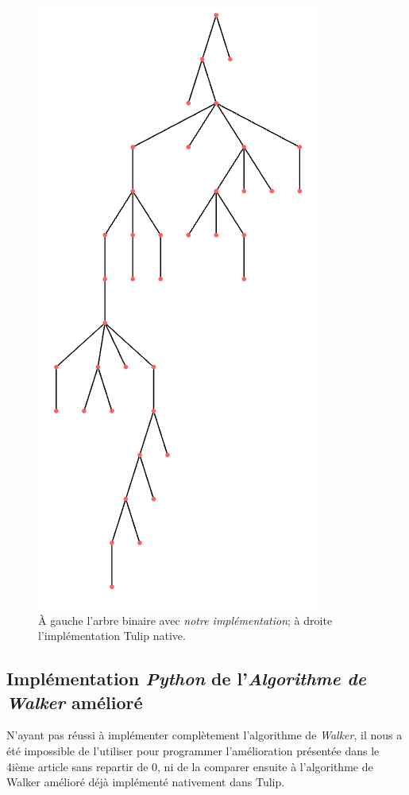 \documentclass{article}
\begin{document}
\begin{figure}[h]
\begin{center}
\begin{right}
          \includegraphics[scale=0.22]{exemple2correct.png}
        \end{right}
      \end{center}
    \caption{À gauche l'arbre binaire avec \emph{notre implémentation}; à droite l'implémentation Tulip native.}
    \label{fig:walkers}
  \end{figure}
  \vfill

\newpage
\subsection{Implémentation \emph{Python} de l'\emph{Algorithme de Walker} amélioré \cite{article02}}

N'ayant pas réussi à implémenter complètement l'algorithme de \emph{Walker}, il nous a été impossible de l'utiliser pour programmer l'amélioration présentée dans le 4ième article sans repartir de 0, ni de la comparer ensuite à l'algorithme de Walker amélioré déjà implémenté nativement dans Tulip.\\
\end{document}
